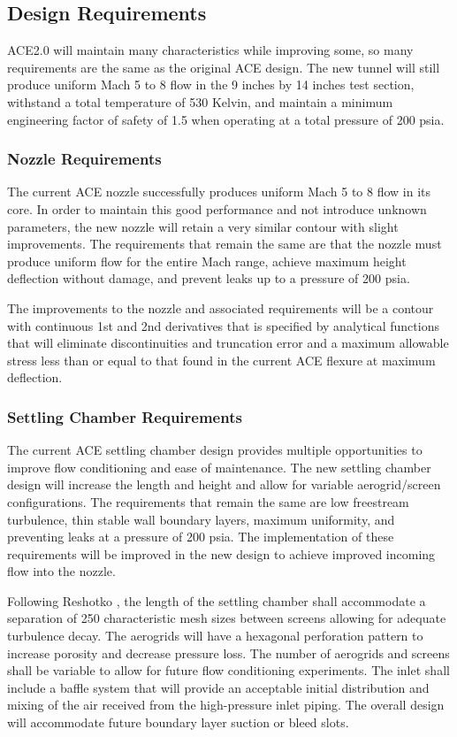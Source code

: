 \subsection{Design Requirements}

ACE2.0 will maintain many characteristics while improving some, so many requirements are the same as the original ACE design. The new tunnel will still produce uniform Mach 5 to 8 flow in the 9 inches by 14 inches test section, withstand a total temperature of 530 Kelvin, and maintain a minimum engineering factor of safety of 1.5 when operating at a total pressure of 200 psia.

\subsubsection*{Nozzle Requirements}

The current ACE nozzle successfully produces uniform Mach 5 to 8 flow in its core. In order to maintain this good performance and not introduce unknown parameters, the new nozzle will retain a very similar contour with slight improvements. The requirements that remain the same are that the nozzle must produce uniform flow for the entire Mach range, achieve maximum height deflection without damage, and prevent leaks up to a pressure of 200 psia.

The improvements to the nozzle and associated requirements will be a contour with continuous 1st and 2nd derivatives that is specified by analytical functions that will eliminate discontinuities and truncation error and a maximum allowable stress less than or equal to that found in the current ACE flexure at maximum deflection.

\subsubsection*{Settling Chamber Requirements}

The current ACE settling chamber design provides multiple opportunities to improve flow conditioning and ease of maintenance. The new settling chamber design will increase the length and height and allow for variable aerogrid/screen configurations. The requirements that remain the same are low freestream turbulence, thin stable wall boundary layers, maximum uniformity, and preventing leaks at a pressure of 200 psia. The implementation of these requirements will be improved in the new design to achieve improved incoming flow into the nozzle.

Following Reshotko \cite{reshotko}, the length of the settling chamber shall accommodate a separation of 250 characteristic mesh sizes between screens allowing for adequate turbulence decay. The aerogrids will have a hexagonal perforation pattern to increase porosity and decrease pressure loss. The number of aerogrids and screens shall be variable to allow for future flow conditioning experiments. The inlet shall include a baffle system that will provide an acceptable initial distribution and mixing of the air received from the high-pressure inlet piping. The overall design will accommodate future boundary layer suction or bleed slots.

